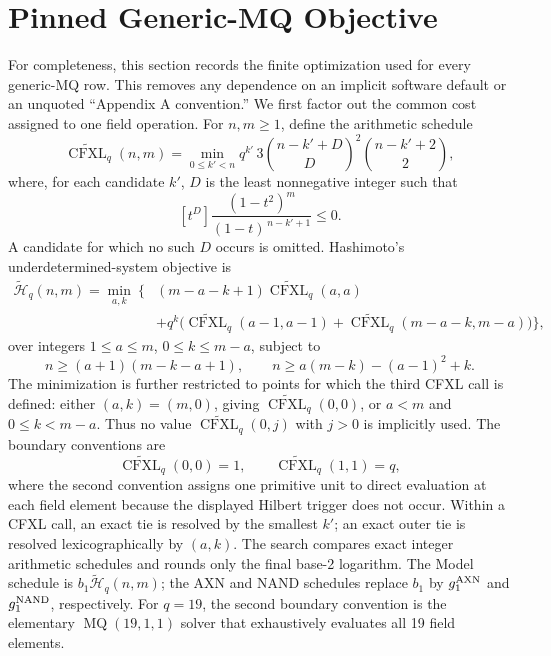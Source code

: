\documentclass[11pt]{article}
\begin{document}
\section{Pinned Generic-MQ Objective}\label{app:generic-mq-certificate}

For completeness, this section records the finite optimization used for every
generic-MQ row.  This removes any dependence on an implicit software default
or an unquoted ``Appendix A convention.''  We first factor out the common
cost assigned to one field operation.  For $n,m\ge1$, define the arithmetic
schedule
\[
 \widetilde{\operatorname{CFXL}}_q(n,m)
 =\min_{0\le k'<n}
 q^{k'}\,3
 \binom{n-k'+D}{D}^{\!2}
 \binom{n-k'+2}{2},
\]
where, for each candidate $k'$, $D$ is the least nonnegative integer such
that
\[
 [t^D]\frac{(1-t^2)^m}{(1-t)^{\,n-k'+1}}\le0.
\]
A candidate for which no such $D$ occurs is omitted.  Hashimoto's
underdetermined-system objective is
\[
\begin{split}
 \widetilde{\mathcal H}_q(n,m)=\min_{a,k}\ \{&
 (m-a-k+1)\widetilde{\operatorname{CFXL}}_q(a,a)\\
 &+q^k\bigl(
 \widetilde{\operatorname{CFXL}}_q(a-1,a-1)
 +\widetilde{\operatorname{CFXL}}_q(m-a-k,m-a)\bigr)\},
\end{split}
\]
over integers $1\le a\le m$, $0\le k\le m-a$, subject to
\[
 n\ge(a+1)(m-k-a+1),
 \qquad
 n\ge a(m-k)-(a-1)^2+k.
\]
The minimization is further restricted to points for which the third CFXL
call is defined: either $(a,k)=(m,0)$, giving
$\widetilde{\operatorname{CFXL}}_q(0,0)$, or $a<m$ and
$0\le k<m-a$.  Thus no value
$\widetilde{\operatorname{CFXL}}_q(0,j)$ with $j>0$ is implicitly used.
The boundary conventions are
\[
 \widetilde{\operatorname{CFXL}}_q(0,0)=1,
 \qquad
 \widetilde{\operatorname{CFXL}}_q(1,1)=q,
\]
where the second convention assigns one primitive unit to direct evaluation
at each field element because the displayed Hilbert trigger does not occur.
Within a CFXL call, an
exact tie is resolved by the smallest $k'$; an exact outer tie is resolved
lexicographically by $(a,k)$.  The search compares exact integer arithmetic
schedules and rounds only the final base-2 logarithm.  The Model schedule is
$b_1\widetilde{\mathcal H}_q(n,m)$; the AXN and NAND schedules replace $b_1$
by $g_1^{\rm AXN}$ and $g_1^{\rm NAND}$, respectively.
For $q=19$, the second boundary convention is the elementary
$\operatorname{MQ}(19,1,1)$ solver that exhaustively evaluates all 19 field
elements.
\end{document}
